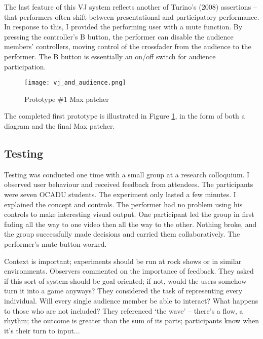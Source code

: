 The last feature of this VJ system reflects another of Turino's (2008) assertions -- that performers often shift between presentational and participatory performance. In response to this, I provided the performing user with a mute function. By pressing the controller's B button, the performer can disable the audience members' controllers, moving control of the crossfader from the audience to the performer. The B button is essentially an on/off switch for audience participation.

\begin{figure}
	\centering

	\texttt{[image: vj\_and\_audience.png]}
	\caption{Prototype \#1 Max patcher}

	\label{prototyping1.5}
\end{figure}

The completed first prototype is illustrated in Figure \ref{prototyping1.5}, in the form of both a diagram and the final Max patcher.

\subsection{Testing}

Testing was conducted one time with a small group at a research colloquium. I observed user behaviour and received feedback from attendees. The participants were seven OCADU students. The experiment only lasted a few minutes. I explained the concept and controls. The performer had no problem using his controls to make interesting visual output. One participant led the group in first fading all the way to one video then all the way to the other. Nothing broke, and the group successfully made decisions and carried them collaboratively. The performer's mute button worked.

Context is important; experiments should be run at rock shows or in similar environments. Observers commented on the importance of feedback. They asked if this sort of system should be goal oriented; if not, would the users somehow turn it into a game anyways? They considered the task of representing every individual. Will every single audience member be able to interact? What happens to those who are not included? They referenced `the wave' -- there's a flow, a rhythm; the outcome is greater than the sum of its parts; participants know when it's their turn to input...

